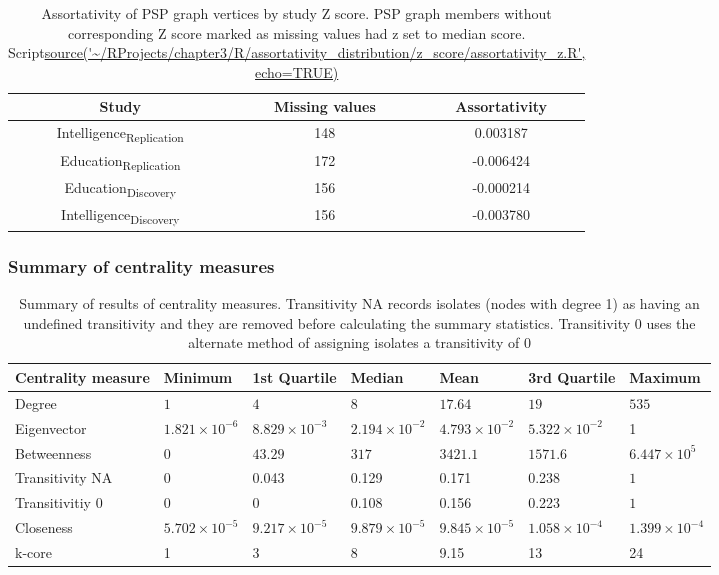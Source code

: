  
 
\begin{table}[]
     \centering
     \begin{tabular}{ccc}
     \toprule
         Study & Missing values  & Assortativity\\
         \midrule
         Intelligence\textsubscript{Replication} & 148 & 0.003187\\
         Education\textsubscript{Replication} & 172 & -0.006424\\
         Education\textsubscript{Discovery} & 156 & -0.000214\\
         Intelligence\textsubscript{Discovery} & 156 & -0.003780\\
         \bottomrule
     \end{tabular}
     \caption{Assortativity of PSP graph vertices by study Z score. PSP graph members without corresponding Z score marked as missing values had z set to median score. Script\url{source('~/RProjects/chapter3/R/assortativity_distribution/z_score/assortativity_z.R', echo=TRUE)}}
     \label{tab:Assortativity of PSP graph and z scores_impute_median}
 \end{table}
 
 \subsubsection{Summary of centrality measures}
\begin{table}[ht]
\centering
\begin{adjustbox}{width=\textwidth}

\begin{tabular}{lllllll}
  \toprule
 Centrality measure & Minimum & 1st Quartile & Median & Mean & 3rd Quartile & Maximum \\ 
 \midrule
Degree & $1 $ & $4 $ & $8 $ & $17.64$  & $19$ & $535$ \\ 
  Eigenvector & $1.821 \times 10^{-6}$ & $8.829 \times 10^{-3}$ & $2.194 \times 10^{-2}$ & $4.793 \times 10^{-2}$ & $5.322 \times 10^{-2}$ & 1 \\ 
   Betweenness & $0 $ & $43.29 $ & $317 $ & $3421.1$ & $1571.6$& $6.447 \times 10^{5}$ \\ 
  Transitivity NA & 0  & 0.043 & 0.129 & 0.171 & 0.238 & $1 $ \\ 
  Transitivitiy 0 & 0  & 0 & 0.108  & 0.156  & 0.223  & $1$ \\ 
  Closeness & $5.702 \times 10^{-5}$ & $9.217 \times 10^{-5}$ & $9.879 \times 10^{-5}$ & $9.845 \times 10^{-5}$ & $1.058 \times 10^{-4}$ & $1.399 \times 10^{-4}$ \\ 
  k-core & 1 & 3 & 8 & 9.15 & 13& 24 \\ 
   \bottomrule
\end{tabular}
\end{adjustbox}
\caption{Summary of results of centrality measures. Transitivity NA records isolates (nodes with degree 1) as having an undefined transitivity and they are removed before calculating the summary statistics. Transitivity 0 uses the alternate method of assigning isolates a transitivity of 0} 
\label{Table:Summary of centrality measures}
\end{table}

